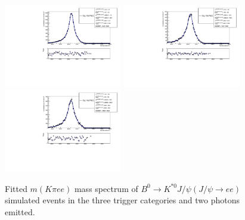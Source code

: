 \begin{figure}[h!]
\centering
\includegraphics[width=0.46\textwidth]{RKst/figs/fit_EEs_0_EE-q2central-gmc/KstJPsEE_2g_L0E_fitAndRes.pdf}
\includegraphics[width=0.46\textwidth]{RKst/figs/fit_EEs_0_EE-q2central-gmc/KstJPsEE_2g_L0H_fitAndRes.pdf}
\includegraphics[width=0.46\textwidth]{RKst/figs/fit_EEs_0_EE-q2central-gmc/KstJPsEE_2g_L0I_fitAndRes.pdf}
\caption{Fitted $m(K\pi ee)$ mass spectrum of $B^0 \rightarrow K^{*0} J/\psi(J/\psi\rightarrow ee)$ simulated
events in the three trigger categories and two photons emitted. }
\label{fig:FitEE_MC_inTrigCat_Brem2}
\end{figure}
%
